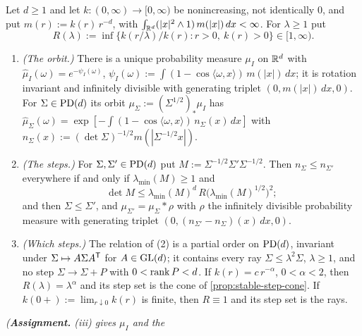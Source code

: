 \begin{proposition}
\label{prop:orbit-step-cone}
\leanok
Let $d \ge 1$ and let $k : (0,\infty) \to [0,\infty)$ be nonincreasing, not identically $0$, and put
$m(r) := k(r)\,r^{-d}$, with $\int_{\mathbb{R}^d}(|x|^2 \wedge 1)\,m(|x|)\,dx < \infty$. For $\lambda \ge 1$ put
\[
  R(\lambda) := \inf\{k(r/\lambda)/k(r) : r > 0,\ k(r) > 0\} \in [1, \infty) .
\]
\begin{enumerate}
\item \emph{(The orbit.)} There is a unique probability measure $\mu_I$ on $\mathbb{R}^d$ with
$\widehat\mu_I(\omega) = e^{-\psi_I(\omega)}$, $\psi_I(\omega) := \int(1 - \cos\langle\omega,x\rangle)\,
m(|x|)\,dx$; it is rotation invariant and infinitely divisible with generating triplet
$(0, m(|x|)\,dx, 0)$. For $\Sigma \in \mathrm{PD}(d)$ its orbit $\mu_\Sigma := (\Sigma^{1/2})_*\mu_I$ has
$\widehat\mu_\Sigma(\omega) = \exp[-\int(1 - \cos\langle\omega,x\rangle)\,n_\Sigma(x)\,dx]$ with
$n_\Sigma(x) := (\det\Sigma)^{-1/2}m(|\Sigma^{-1/2}x|)$.
\item \emph{(The steps.)} For $\Sigma, \Sigma' \in \mathrm{PD}(d)$ put $M := \Sigma^{-1/2}\Sigma'\Sigma^{-1/2}$.
Then $n_\Sigma \le n_{\Sigma'}$ everywhere if and only if $\lambda_{\min}(M) \ge 1$ and
\[
  \det M \le \lambda_{\min}(M)^d\,R\bigl(\lambda_{\min}(M)^{1/2}\bigr)^2 ;
\]
and then $\Sigma \le \Sigma'$, and $\mu_{\Sigma'} = \mu_\Sigma * \rho$ with $\rho$ the infinitely
divisible probability measure with generating triplet $(0, (n_{\Sigma'} - n_\Sigma)(x)\,dx, 0)$.
\item \emph{(Which steps.)} The relation of (2) is a partial order on $\mathrm{PD}(d)$, invariant under
$\Sigma \mapsto A\Sigma A^{\mathsf{T}}$ for $A \in \mathrm{GL}(d)$; it contains every ray $\Sigma \le \lambda^2\Sigma$,
$\lambda \ge 1$, and no step $\Sigma \to \Sigma + P$ with $0 < \operatorname{rank} P < d$. If
$k(r) = c\,r^{-\alpha}$, $0 < \alpha < 2$, then $R(\lambda) = \lambda^\alpha$ and its step set is the cone of
\ref{prop:stable-step-cone}. If $k(0{+}) := \lim_{r\downarrow0}k(r)$ is finite, then $R \equiv 1$ and
its step set is the rays.
\end{enumerate}
\statusA\quad{}\quad\emph{(\textbf{Assignment.} (iii) gives $\mu_I$ and the
}
\end{proposition}
